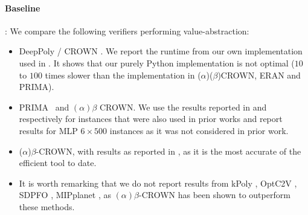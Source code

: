 \paragraph{Baseline}: 
We compare the following verifiers performing value-abstraction:
\begin{itemize}
	\item DeepPoly \cite{deeppoly}/ CROWN \cite{crown}. We report the runtime from our own implementation used in {\toolname}. It shows that our purely Python implementation is not optimal ($10$ to $100$ times slower than the implementation in ($\alpha$)($\beta$)CROWN, ERAN and PRIMA). 
	\item PRIMA~\cite{prima} and $(\alpha)\beta$ CROWN. We use the results reported in \cite{prima} and \cite{crown} respectively for instances that were also used in prior works and report results for MLP $6\times500$ instances as it was not considered in prior work.  
	
	\item ($\alpha$)$\beta$-CROWN, with results as reported in \cite{crown}, as it is the most accurate of the efficient tool to date. 
	\item It is worth remarking that we do not report results from kPoly \cite{kpoly}, OptC2V \cite{optC2V}, 
	SDPFO \cite{SDPFI}, MIPplanet \cite{MIPplanet}, as $(\alpha)\beta$-CROWN has been shown to outperform these methods\cite{crown}. 
	
\end{itemize}



